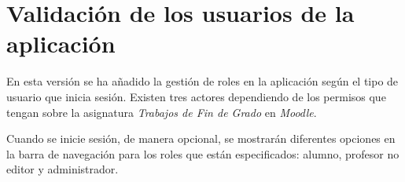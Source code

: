 \section{Validación de los usuarios de la aplicación}

En esta versión se ha añadido la gestión de roles en la aplicación según el tipo de usuario que inicia sesión. Existen tres actores dependiendo de los permisos que tengan sobre la asignatura \emph{Trabajos de Fin de Grado} en \emph{Moodle}.

Cuando se inicie sesión, de manera opcional, se mostrarán diferentes opciones en la barra de navegación para los roles que están especificados: alumno, profesor no editor y administrador.